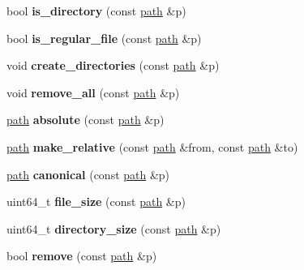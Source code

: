 \begin{DoxyCompactItemize}
bool {\bfseries is\+\_\+directory} (const \mbox{\hyperlink{classfc_1_1path}{path}} \&p)
\item 
\mbox{\label{namespacefc_a6855142912d4cfb89281ba0c7f4938a2}} 
bool {\bfseries is\+\_\+regular\+\_\+file} (const \mbox{\hyperlink{classfc_1_1path}{path}} \&p)
\item 
\mbox{\label{namespacefc_a76b0787468a9f403087b71a894c07ce2}} 
void {\bfseries create\+\_\+directories} (const \mbox{\hyperlink{classfc_1_1path}{path}} \&p)
\item 
\mbox{\label{namespacefc_a50ad24e0099358d167967f9df2e368fc}} 
void {\bfseries remove\+\_\+all} (const \mbox{\hyperlink{classfc_1_1path}{path}} \&p)
\item 
\mbox{\label{namespacefc_ab76ad94ec93db365293a67053393fbb4}} 
\mbox{\hyperlink{classfc_1_1path}{path}} {\bfseries absolute} (const \mbox{\hyperlink{classfc_1_1path}{path}} \&p)
\item 
\mbox{\label{namespacefc_a9fcdf886a023ef71441fd2f02ef3dc04}} 
\mbox{\hyperlink{classfc_1_1path}{path}} {\bfseries make\+\_\+relative} (const \mbox{\hyperlink{classfc_1_1path}{path}} \&from, const \mbox{\hyperlink{classfc_1_1path}{path}} \&to)
\item 
\mbox{\label{namespacefc_ac7ca5987762ad2fba3d278b956067171}} 
\mbox{\hyperlink{classfc_1_1path}{path}} {\bfseries canonical} (const \mbox{\hyperlink{classfc_1_1path}{path}} \&p)
\item 
\mbox{\label{namespacefc_aae3e907b120751591ca6919ac66c384b}} 
uint64\+\_\+t {\bfseries file\+\_\+size} (const \mbox{\hyperlink{classfc_1_1path}{path}} \&p)
\item 
\mbox{\label{namespacefc_ab533ebf0126ab57947f79946c342acec}} 
uint64\+\_\+t {\bfseries directory\+\_\+size} (const \mbox{\hyperlink{classfc_1_1path}{path}} \&p)
\item 
\mbox{\label{namespacefc_a0db76f35dc060918029b16de918b1e84}} 
bool {\bfseries remove} (const \mbox{\hyperlink{classfc_1_1path}{path}} \&p)
\item 

\end{DoxyCompactItemize}
